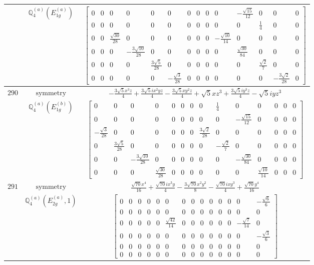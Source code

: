 \documentclass[fleqn,8pt,landscape]{jsarticle}
\begin{document}
\begin{longtable}{ccc}
$  $ & $ \mathbb{Q}_{4}^{(a)}(E_{1g}^{(a)}) $ & $ \begin{bmatrix} 0 & 0 & 0 & 0 & 0 & 0 & 0 & 0 & 0 & 0 & - \frac{\sqrt{15}}{12} & 0 & 0 & 0 \\ 0 & 0 & 0 & 0 & 0 & 0 & 0 & 0 & 0 & 0 & 0 & \frac{1}{4} & 0 & 0 \\ 0 & 0 & \frac{\sqrt{30}}{28} & 0 & 0 & 0 & 0 & 0 & 0 & - \frac{\sqrt{10}}{14} & 0 & 0 & 0 & 0 \\ 0 & 0 & 0 & - \frac{3 \sqrt{10}}{28} & 0 & 0 & 0 & 0 & 0 & 0 & \frac{\sqrt{30}}{84} & 0 & 0 & 0 \\ 0 & 0 & 0 & 0 & \frac{3 \sqrt{5}}{28} & 0 & 0 & 0 & 0 & 0 & 0 & \frac{\sqrt{2}}{7} & 0 & 0 \\ 0 & 0 & 0 & 0 & 0 & - \frac{\sqrt{3}}{28} & 0 & 0 & 0 & 0 & 0 & 0 & - \frac{3 \sqrt{2}}{28} & 0 \end{bmatrix} $ \\ \hline
$ 290 $ & $ \text{symmetry} $ & $ - \frac{3 \sqrt{5} x^{3} z}{4} + \frac{3 \sqrt{5} i x^{2} y z}{4} - \frac{3 \sqrt{5} x y^{2} z}{4} + \sqrt{5} x z^{3} + \frac{3 \sqrt{5} i y^{3} z}{4} - \sqrt{5} i y z^{3} $ \\
$  $ & $ \mathbb{Q}_{4}^{(a)}(E_{1g}^{(b)}) $ & $ \begin{bmatrix} 0 & 0 & 0 & 0 & 0 & 0 & 0 & 0 & \frac{1}{4} & 0 & 0 & 0 & 0 & 0 \\ 0 & 0 & 0 & 0 & 0 & 0 & 0 & 0 & 0 & - \frac{\sqrt{15}}{12} & 0 & 0 & 0 & 0 \\ - \frac{\sqrt{3}}{28} & 0 & 0 & 0 & 0 & 0 & 0 & \frac{3 \sqrt{2}}{28} & 0 & 0 & 0 & 0 & 0 & 0 \\ 0 & \frac{3 \sqrt{5}}{28} & 0 & 0 & 0 & 0 & 0 & 0 & - \frac{\sqrt{2}}{7} & 0 & 0 & 0 & 0 & 0 \\ 0 & 0 & - \frac{3 \sqrt{10}}{28} & 0 & 0 & 0 & 0 & 0 & 0 & - \frac{\sqrt{30}}{84} & 0 & 0 & 0 & 0 \\ 0 & 0 & 0 & \frac{\sqrt{30}}{28} & 0 & 0 & 0 & 0 & 0 & 0 & \frac{\sqrt{10}}{14} & 0 & 0 & 0 \end{bmatrix} $ \\ \hline
$ 291 $ & $ \text{symmetry} $ & $ \frac{\sqrt{70} x^{4}}{16} + \frac{\sqrt{70} i x^{3} y}{4} - \frac{3 \sqrt{70} x^{2} y^{2}}{8} - \frac{\sqrt{70} i x y^{3}}{4} + \frac{\sqrt{70} y^{4}}{16} $ \\
$  $ & $ \mathbb{Q}_{4}^{(a)}(E_{2g}^{(a)},1) $ & $ \begin{bmatrix} 0 & 0 & 0 & 0 & 0 & 0 & 0 & 0 & 0 & 0 & 0 & 0 & 0 & - \frac{\sqrt{6}}{6} \\ 0 & 0 & 0 & 0 & 0 & 0 & 0 & 0 & 0 & 0 & 0 & 0 & 0 & 0 \\ 0 & 0 & 0 & 0 & 0 & \frac{\sqrt{42}}{14} & 0 & 0 & 0 & 0 & 0 & 0 & - \frac{\sqrt{7}}{14} & 0 \\ 0 & 0 & 0 & 0 & 0 & 0 & 0 & 0 & 0 & 0 & 0 & 0 & 0 & - \frac{\sqrt{3}}{6} \\ 0 & 0 & 0 & 0 & 0 & 0 & 0 & 0 & 0 & 0 & 0 & 0 & 0 & 0 \\ 0 & 0 & 0 & 0 & 0 & 0 & 0 & 0 & 0 & 0 & 0 & 0 & 0 & 0 \end{bmatrix} $ \\ \hline

\end{longtable}
\end{document}
